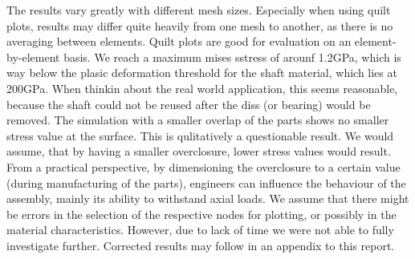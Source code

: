 \documentclass[12pt]{article}
\begin{document}
The results vary greatly with different mesh sizes. Especially when using quilt plots,
results may differ quite heavily from one mesh to another, as there is no averaging between elements.
Quilt plots are good for evaluation on an element-by-element basis.
We reach a maximum mises sstress of arounf 1.2GPa, which is way below the plasic deformation threshold
for the shaft material, which lies at 200GPa. When thinkin about the real world application, this seems
reasonable, because the shaft could not be reused after the diss (or bearing) would be removed.
The simulation with a smaller overlap of the parts shows no smaller stress value at the surface.
This is qulitatively a questionable result. We would assume, that by having a smaller
overclosure, lower stress values would result.
From a practical perspective, by dimensioning the overclosure to a certain
value (during manufacturing of the parts), engineers can influence the behaviour of the 
assembly, mainly its ability to withstand axial loads. 
We assume that there might be errors in the selection of the respective nodes for plotting,
or possibly in the material characteristics. However, due to lack of time we were not able to 
fully investigate further. Corrected results may follow in an appendix to this report.
\end{document}
